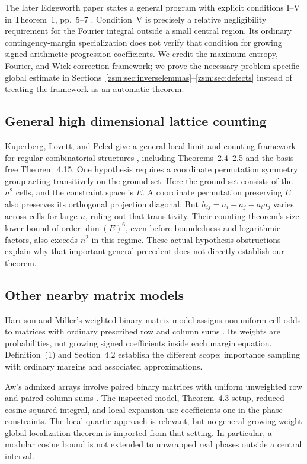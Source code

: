 \documentclass[11pt]{article}
\theoremstyle{definition}\newtheorem{definition}[theorem]{Definition}
\theoremstyle{remark}\newtheorem{remark}[theorem]{Remark}
\begin{document}
The later Edgeworth paper states a general program with explicit conditions
I--V in Theorem~1, pp.~5--7 \cite{bhedgeworth}. Condition~V is precisely a
relative negligibility requirement for the Fourier integral outside a small
central region. Its ordinary contingency-margin specialization does not
verify that condition for growing signed arithmetic-progression coefficients.
We credit the maximum-entropy, Fourier, and Wick correction framework; we
prove the necessary problem-specific global estimate in
Sections~\ref{zsm:sec:inverselemmas}--\ref{zsm:sec:defects} instead of treating the
framework as an automatic theorem.

\subsection{General high dimensional lattice counting}
Kuperberg, Lovett, and Peled give a general local-limit and counting framework
for regular combinatorial structures \cite{klp}, including Theorems~2.4--2.5
and the basis-free Theorem~4.15. One hypothesis requires a coordinate
permutation symmetry group acting transitively on the ground set. Here the
ground set consists of the $n^2$ cells, and the constraint space is $E$.
A coordinate permutation preserving $E$ also preserves its orthogonal
projection diagonal. But $h_{ij}=a_i+a_j-a_ia_j$ varies across cells for large
$n$, ruling out that transitivity. Their counting theorem's size lower bound
of order $\dim(E)^6$, even before boundedness and logarithmic factors, also
exceeds $n^2$ in this regime. These actual hypothesis obstructions explain why
that important general precedent does not directly establish our theorem.

\subsection{Other nearby matrix models}
Harrison and Miller's weighted binary matrix model assigns nonuniform cell odds
to matrices with ordinary prescribed row and column sums \cite{harrison}.
Its weights are probabilities, not growing signed coefficients inside each
margin equation. Definition~(1) and Section~4.2 establish the different scope:
importance sampling with ordinary margins and associated approximations.

Aw's admixed arrays involve paired binary matrices with uniform unweighted
row and paired-column sums \cite{aw}. The inspected model, Theorem~4.3 setup,
reduced cosine-squared integral, and local expansion use coefficients one in
the phase constraints. The local quartic approach is relevant, but no general
growing-weight global-localization theorem is imported from that setting.
In particular, a modular cosine bound is not extended to unwrapped real
phases outside a central interval.
\end{document}
